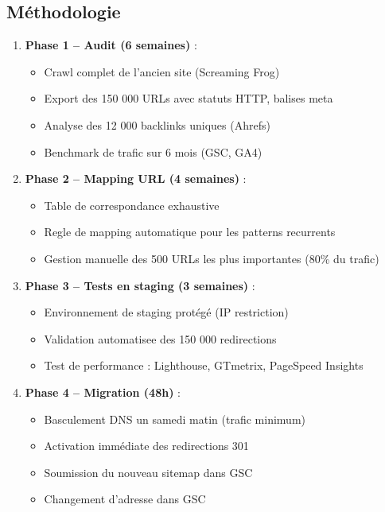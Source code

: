 \documentclass[12pt,a4paper,twoside]{report}
\begin{document}
\subsection{Méthodologie}

\begin{enumerate}
    \item \textbf{Phase 1 -- Audit (6 semaines)} :
    \begin{itemize}
        \item Crawl complet de l'ancien site (Screaming Frog)
        \item Export des 150 000 URLs avec statuts HTTP, balises meta
        \item Analyse des 12 000 backlinks uniques (Ahrefs)
        \item Benchmark de trafic sur 6 mois (GSC, GA4)
    \end{itemize}
    \item \textbf{Phase 2 -- Mapping URL (4 semaines)} :
    \begin{itemize}
        \item Table de correspondance exhaustive
        \item Regle de mapping automatique pour les patterns recurrents
        \item Gestion manuelle des 500 URLs les plus importantes (80\% du trafic)
    \end{itemize}
    \item \textbf{Phase 3 -- Tests en staging (3 semaines)} :
    \begin{itemize}
        \item Environnement de staging protégé (IP restriction)
        \item Validation automatisee des 150 000 redirections
        \item Test de performance : Lighthouse, GTmetrix, PageSpeed Insights
    \end{itemize}
    \item \textbf{Phase 4 -- Migration (48h)} :
    \begin{itemize}
        \item Basculement DNS un samedi matin (trafic minimum)
        \item Activation immédiate des redirections 301
        \item Soumission du nouveau sitemap dans GSC
        \item Changement d'adresse dans GSC
    \end{itemize}
\end{enumerate}
\end{document}
